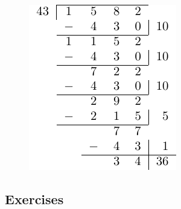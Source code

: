 \documentclass[
]{book}
\theoremstyle{definition}
\theoremstyle{definition}
\theoremstyle{definition}
\theoremstyle{remark}
\begin{document}
\begin{figure}

{\centering \includegraphics[width=0.6\linewidth]{tikz/division-algorithm-standard} 

}

\end{figure}

\hypertarget{exercises-11}{%
\subsection{Exercises}\label{exercises-11}}
\end{document}
